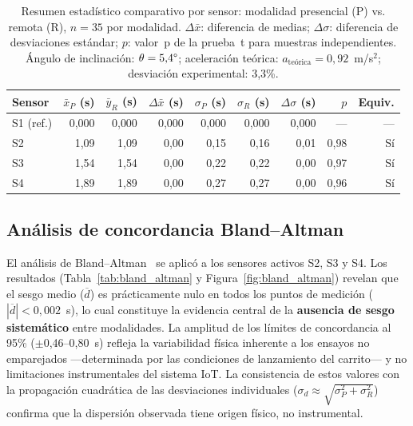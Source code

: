 \documentclass{espol-rte}
\begin{document}
\begin{table}[htbp]
\caption{Resumen estad\'istico comparativo por sensor: modalidad presencial (P) vs. remota (R), $n = 35$ por modalidad. $\Delta\bar{x}$: diferencia de medias; $\Delta\sigma$: diferencia de desviaciones est\'andar; $p$: valor~p de la prueba~t para muestras independientes. \'Angulo de inclinaci\'on: $\theta = 5{,}4\degree$; aceleraci\'on te\'orica: $a_{\text{te\'orica}} = 0{,}92$~m/s$^2$; desviaci\'on experimental: 3{,}3\%.}
\label{tab:resumen_global}
\centering
\scriptsize
\begin{tabular}{lrrrrrrrr}
\toprule
\textbf{Sensor} & $\bar{x}_P$ (s) & $\bar{y}_R$ (s) & $\Delta\bar{x}$ (s) & $\sigma_P$ (s) & $\sigma_R$ (s) & $\Delta\sigma$ (s) & $p$ & \textbf{Equiv.} \\
\midrule
S1 (ref.) & 0{,}000 & 0{,}000 & 0{,}000 & 0{,}000 & 0{,}000 & 0{,}000 & {---} & {---} \\
S2        & 1{,}09  & 1{,}09  & 0{,}00  & 0{,}15  & 0{,}16  & 0{,}01  & 0{,}98 & S\'i \\
S3        & 1{,}54  & 1{,}54  & 0{,}00  & 0{,}22  & 0{,}22  & 0{,}00  & 0{,}97 & S\'i \\
S4        & 1{,}89  & 1{,}89  & 0{,}00  & 0{,}27  & 0{,}27  & 0{,}00  & 0{,}96 & S\'i \\
\bottomrule
\end{tabular}
\end{table}

\subsection{An\'alisis de concordancia Bland--Altman}

El an\'alisis de Bland--Altman~\parencite{bland1986} se aplic\'o a los sensores activos S2, S3 y S4. Los resultados (Tabla~\ref{tab:bland_altman} y Figura~\ref{fig:bland_altman}) revelan que el sesgo medio ($\overline{d}$) es pr\'acticamente nulo en todos los puntos de medici\'on ($|\overline{d}| < 0{,}002$~s), lo cual constituye la evidencia central de la \textbf{ausencia de sesgo sistem\'atico} entre modalidades. La amplitud de los l\'imites de concordancia al 95\% ($\pm$0{,}46--0{,}80~s) refleja la variabilidad f\'isica inherente a los ensayos no emparejados ---determinada por las condiciones de lanzamiento del carrito--- y no limitaciones instrumentales del sistema IoT. La consistencia de estos valores con la propagaci\'on cuadr\'atica de las desviaciones individuales ($\sigma_d \approx \sqrt{\sigma_P^2 + \sigma_R^2}$) confirma que la dispersi\'on observada tiene origen f\'isico, no instrumental.
\end{document}
